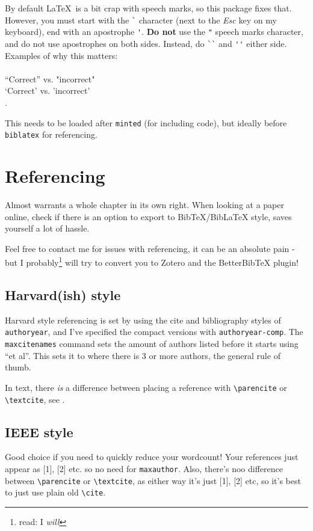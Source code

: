 \documentclass[../main]{subfiles}
\begin{document}
By default \LaTeX\ is a bit crap with speech marks, so this package fixes that. However, you must start with the \verb|`| character (next to the \emph{Esc} key on my keyboard), end with an apostrophe \verb|'|. \textbf{Do not} use the \verb|"| speech marks character, and do not use apostrophes on both sides. Instead, do \verb|``| and \verb|''| either side. Examples of why this matters:\\
\\
\noindent``Correct'' vs. "incorrect"\\
`Correct' vs. 'incorrect'\\.

This needs to be loaded after \texttt{minted} (for including code), but ideally before \texttt{biblatex} for referencing.

\section{Referencing}

Almost warrants a whole chapter in its own right. 
When looking at a paper online, check if there is an option to export to BibTeX/BibLaTeX style, saves yourself a lot of hassle. 

Feel free to contact me for issues with referencing, it can be an absolute pain - but I probably\footnote{read: I \textit{will}} will try to convert you to Zotero and the BetterBibTeX plugin! 

\subsection{Harvard(ish) style}

Harvard style referencing is set by using the cite and bibliography styles of \texttt{authoryear}, and I've specified the compact versions with \texttt{authoryear-comp}. The \texttt{maxcitenames} command sets the amount of authors listed before it starts using ``et al''. This sets it to where there is 3 or more authors, the general rule of thumb.

In text, there \textit{is} a difference between placing a reference with \verb|\parencite| or \verb|\textcite|, see .

\subsection{IEEE style}

Good choice if you need to quickly reduce your wordcount! Your references just appear as [1], [2] etc. so no need for \texttt{maxauthor}. Also, there's noo difference between \verb|\parencite| or \verb|\textcite|, as either way it's just [1], [2] etc, so it's best to just use plain old \verb|\cite|.
\end{document}
